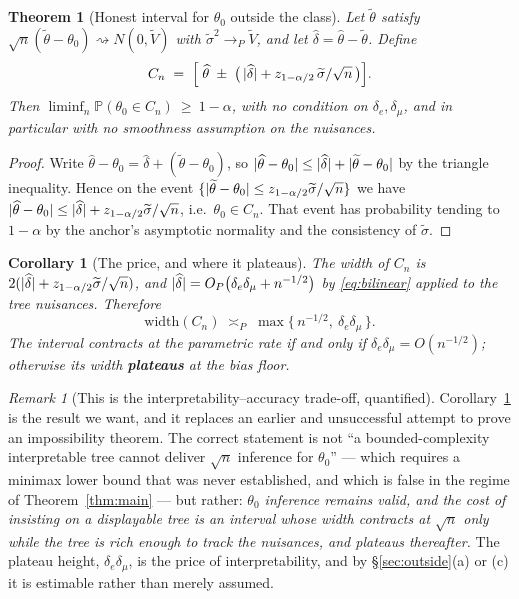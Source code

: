 \documentclass[11pt]{article}
\theoremstyle{plain}
\newtheorem{theorem}{Theorem}
\newtheorem{corollary}{Corollary}
\theoremstyle{definition}
\theoremstyle{remark}
\newtheorem{remark}{Remark}
\newcommand{\PP}{\mathbb{P}}
\newcommand{\thetahat}{\widehat{\theta}}
\DeclarePairedDelimiter{\abs}{\lvert}{\rvert}
\begin{document}
\begin{theorem}[Honest interval for $\theta_0$ outside the class]\label{prop:honest}
Let $\widetilde\theta$ satisfy
$\sqrt n(\widetilde\theta-\theta_0)\rightsquigarrow N(0,\widetilde V)$ with
$\widetilde\sigma^2\to_P\widetilde V$, and let
$\widehat\delta=\thetahat-\widetilde\theta$. Define
\[
  C_n \;=\; \Bigl[\;\thetahat \;\pm\; \bigl(\,\abs{\widehat\delta}
      + z_{1-\alpha/2}\,\widetilde\sigma/\sqrt n\,\bigr)\Bigr].
\]
Then $\liminf_n \PP(\theta_0\in C_n)\ \ge\ 1-\alpha$, with no condition on
$\delta_e,\delta_\mu$, and in particular with no smoothness assumption on the
nuisances.
\end{theorem}

\begin{proof}
Write $\thetahat-\theta_0 = \widehat\delta + (\widetilde\theta-\theta_0)$, so
$\abs{\thetahat-\theta_0}\le\abs{\widehat\delta}+\abs{\widetilde\theta-\theta_0}$
by the triangle inequality. Hence on the event
$\{\abs{\widetilde\theta-\theta_0}\le z_{1-\alpha/2}\widetilde\sigma/\sqrt n\}$ we
have $\abs{\thetahat-\theta_0}\le\abs{\widehat\delta}+z_{1-\alpha/2}\widetilde\sigma/\sqrt n$,
i.e.\ $\theta_0\in C_n$. That event has probability tending to $1-\alpha$ by the
anchor's asymptotic normality and the consistency of $\widetilde\sigma$.
\end{proof}

\begin{corollary}[The price, and where it plateaus]\label{cor:width}
The width of $C_n$ is $2(\abs{\widehat\delta}+z_{1-\alpha/2}\widetilde\sigma/\sqrt n)$,
and $\abs{\widehat\delta} = O_P\bigl(\delta_e\delta_\mu + n^{-1/2}\bigr)$ by
\eqref{eq:bilinear} applied to the tree nuisances. Therefore
\[
  \mathrm{width}(C_n) \;\asymp_P\; \max\bigl\{\,n^{-1/2},\ \delta_e\delta_\mu\,\bigr\}.
\]
The interval contracts at the parametric rate \emph{if and only if}
$\delta_e\delta_\mu = O(n^{-1/2})$; otherwise its width \textbf{plateaus} at the
bias floor.
\end{corollary}

\begin{remark}[This is the interpretability--accuracy trade-off, quantified]
Corollary~\ref{cor:width} is the result we want, and it replaces an earlier and
unsuccessful attempt to prove an impossibility theorem. The correct statement is
not ``a bounded-complexity interpretable tree cannot deliver $\sqrt n$ inference
for $\theta_0$'' --- which requires a minimax lower bound that was never
established, and which is false in the regime of Theorem~\ref{thm:main} --- but
rather: \emph{$\theta_0$ inference remains valid, and the cost of insisting on a
displayable tree is an interval whose width contracts at $\sqrt n$ only while the
tree is rich enough to track the nuisances, and plateaus thereafter.} The
plateau height, $\delta_e\delta_\mu$, is the price of interpretability, and by
\S\ref{sec:outside}(a) or (c) it is estimable rather than merely assumed.
\end{remark}
\end{document}
